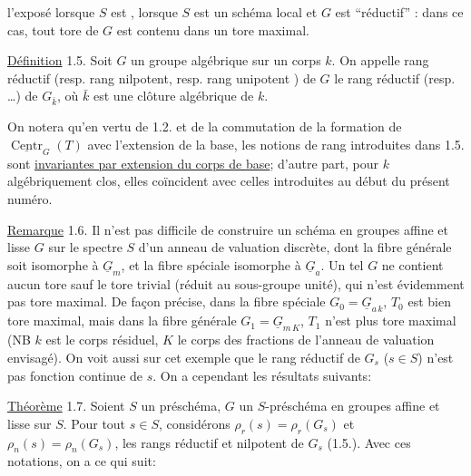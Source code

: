 
l'exposé   lorsque $S$ est ,    lorsque $S$ est un schéma local et $G$ est ``réductif'' : dans ce cas, tout tore de $G$ est contenu dans un tore maximal.

\uline{Définition} 1.5. Soit $G$ un groupe algébrique sur un corps $k$. 
On appelle rang réductif (resp. rang nilpotent, resp. rang unipotent \unsure{\ldots}) de $G$ le rang réductif (resp. \ldots) de $G_{\bar k}$, où $\bar k$ est une clôture algébrique de $k$.

On notera qu'en vertu de 1.2. et de la commutation de la formation de $\underline{\operatorname{Centr}}_G(T)$ avec l'extension de la base,  les  notions de rang introduites dans 1.5. sont \uline{invariantes par extension du corps de base}; d'autre part, pour $k$ algébriquement clos, elles coïncident avec celles introduites au début du présent numéro.

\uline{Remarque} 1.6. Il n'est pas difficile de construire un schéma en groupes affine et lisse $G$ sur le spectre $S$ d'un anneau de valuation discrète, dont la fibre générale soit isomorphe à $\underline G_m$, et la fibre spéciale isomorphe à $\underline G_a$. Un tel $G$ ne contient aucun tore sauf le tore trivial  (réduit au sous-groupe unité), qui n'est évidemment pas tore maximal. De façon précise, dans la fibre spéciale $G_0=\underline G_{a\,k}$, $T_0$ est bien tore maximal, mais dans la fibre générale $G_1=\underline G_{m\,K}$, $T_1$ n'est plus tore maximal (NB $k$ est le corps résiduel, $K$ le corps des fractions de l'anneau de valuation envisagé). On voit aussi sur cet exemple que le rang réductif de $G_s$ ($s\in S$) n'est pas fonction continue de $s$. On a cependant les résultats suivants:

\uline{Théorème} 1.7. Soient $S$ un préschéma, $G$ un $S$-préschéma en groupes affine et lisse sur $S$. Pour tout $s\in S$, considérons $\rho_r(s)=\rho_r(G_s)$ et $\rho_n(s)=\rho_n(G_s)$, les rangs réductif et nilpotent de $G_s$ (1.5.). Avec ces notations, on a ce qui suit:

